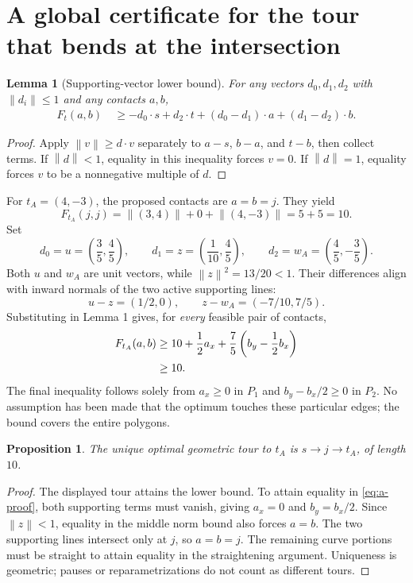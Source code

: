 \documentclass[11pt,a4paper]{article}
\newcommand{\norm}[1]{\left\lVert#1\right\rVert}
\newcommand{\dotp}[2]{#1\mathbin{\cdot}#2}
\newcommand{\sect}[2]{\section{#1}\label{#2}}
\newtheorem{proposition}{Proposition}
\newtheorem{lemma}{Lemma}
\begin{document}
\clearpage
\sect{A global certificate for the tour that bends at the intersection}{sec:a}

\begin{lemma}[Supporting-vector lower bound]
For any vectors $d_0,d_1,d_2$ with $\norm{d_i}\leq1$ and any contacts $a,b$,
\begin{align}
 F_t(a,b)\ &\geq -\dotp{d_0}{s}+\dotp{d_2}{t}
  +\dotp{(d_0-d_1)}{a}+\dotp{(d_1-d_2)}{b}.
 \label{eq:certificate}
\end{align}
\end{lemma}
\begin{proof}
Apply $\norm{v}\geq\dotp{d}{v}$ separately to $a-s$, $b-a$, and $t-b$, then
collect terms. If $\norm{d}<1$, equality in this inequality forces $v=0$.
If $\norm{d}=1$, equality forces $v$ to be a nonnegative multiple of $d$.
\end{proof}

For $t_A=(4,-3)$, the proposed contacts are $a=b=j$. They yield
\[
 F_{t_A}(j,j)=\norm{(3,4)}+0+\norm{(4,-3)}=5+5=10.
\]
Set
\begin{equation}
 d_0=u=\left(\frac35,\frac45\right),\qquad
 d_1=z=\left(\frac1{10},\frac45\right),\qquad
 d_2=w_A=\left(\frac45,-\frac35\right).
\end{equation}
Both $u$ and $w_A$ are unit vectors, while $\norm{z}^2=13/20<1$. Their
differences align with inward normals of the two active supporting lines:
\[
 u-z=(1/2,0),\qquad z-w_A=(-7/10,7/5).
\]
Substituting in Lemma 1 gives, for \emph{every} feasible pair of contacts,
\begin{align}
 F_{t_A}(a,b)
 &\geq 10+\frac12a_x+\frac75\left(b_y-\frac12b_x\right)\notag\\
 &\geq10.
 \label{eq:a-proof}
\end{align}
The final inequality follows solely from $a_x\geq0$ in $P_1$ and
$b_y-b_x/2\geq0$ in $P_2$. No assumption has been made that the optimum
touches these particular edges; the bound covers the entire polygons.

\begin{proposition}
The unique optimal geometric tour to $t_A$ is $s\to j\to t_A$, of length $10$.
\end{proposition}
\begin{proof}
The displayed tour attains the lower bound. To attain equality in
\eqref{eq:a-proof}, both supporting terms must vanish, giving $a_x=0$ and
$b_y=b_x/2$. Since $\norm{z}<1$, equality in the middle norm bound also forces
$a=b$. The two supporting lines intersect only at $j$, so $a=b=j$.
The remaining curve portions must be straight to attain equality in the
straightening argument. Uniqueness is geometric; pauses or reparametrizations
do not count as different tours.
\end{proof}
\end{document}

